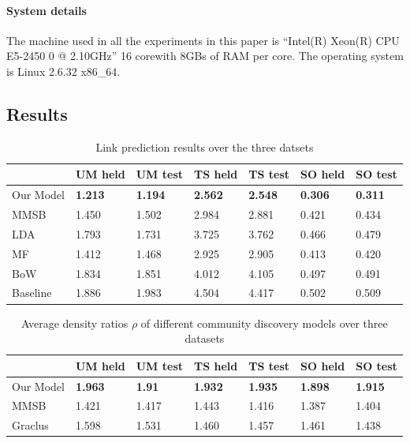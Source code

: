 \documentclass{sig-alternate}
\begin{document}
\paragraph{System details} The machine used in all the experiments in this paper
is ``Intel(R) Xeon(R) CPU E5-2450 0 @ 2.10GHz'' 16 corewith 8GBs of
RAM per core. The operating system is Linux 2.6.32 x86\_64. 

\subsection{Results}
\label{sec:results}

\begin{table}
\begin{center} 
\begin{tabular}{p{1cm}|p{0.7cm}|p{0.7cm}|p{0.7cm}|p{0.7cm}|p{0.7cm}|p{0.7cm}|}
  & UM held & UM test & TS held & TS test & SO held & SO test \\\hline
Our Model & \textbf{1.213} &\textbf{1.194} &\textbf{2.562} & \textbf{2.548} & 
\textbf{0.306}& \textbf{0.311} \\\hline 
MMSB &1.450& 1.502 & 2.984& 2.881 &0.421 & 0.434 \\\hline 
LDA &1.793& 1.731	&3.725 & 3.762 &0.466 & 0.479\\\hline
MF & 1.412 & 1.468 & 2.925 & 2.905 & 0.413 & 0.420 \\\hline
BoW &1.834 & 1.851 & 4.012 & 4.105 & 0.497 & 0.491 \\\hline
Baseline &1.886& 1.983 &4.504 &4.417&0.502& 0.509\\\hline
\end{tabular}
\caption{\small{Link prediction results over the three datsets}}
\label{tab:predictionResults}
\end{center}
\end{table}

\begin{table}
\begin{center} 
\begin{tabular}{p{1cm}|p{0.7cm}|p{0.7cm}|p{0.7cm}|p{0.7cm}|p{0.7cm}|p{0.7cm}|}
  & UM held & UM test & TS held & TS test & SO held & SO test \\\hline
Our Model & \textbf{1.963} &\textbf{1.91} &\textbf{1.932} & \textbf{1.935} & 
\textbf{1.898}& \textbf{1.915} \\\hline 
MMSB &1.421& 1.417 & 1.443& 1.416 &1.387 & 1.404 \\\hline 
Graclus &1.598& 1.531	&1.460 & 1.457 &1.461 & 1.438\\\hline
\end{tabular}
\caption{\small{Average density ratios $\rho$ of different community 
discovery models over three datasets}}
\label{tab:rhoResults}
\end{center}
\end{table}
\end{document}
